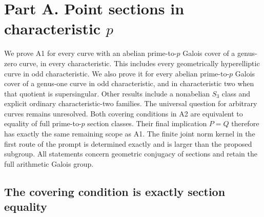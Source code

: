 \section{Part A. Point sections in characteristic \texorpdfstring{$p$}{p}}
\label{sec:partA}

We prove A1 for every curve with an abelian prime-to-$p$ Galois
cover of a genus-zero curve, in every characteristic. This includes
every geometrically hyperelliptic curve in odd characteristic.
We also prove it for every abelian prime-to-$p$ Galois cover of a
genus-one curve in odd characteristic, and in characteristic two
when that quotient is supersingular. Other results include a
nonabelian $S_3$ class and explicit ordinary characteristic-two
families. The universal question for arbitrary curves remains
unresolved. Both covering conditions in A2 are
equivalent to equality of full prime-to-$p$ section classes. Their final
implication $P=Q$ therefore has exactly the same remaining scope as A1.
The finite joint norm kernel in the first route of the prompt is
determined exactly and is larger than the proposed subgroup. All
statements concern geometric conjugacy of sections and retain the full
arithmetic Galois group.

\subsection{The covering condition is exactly section equality}


